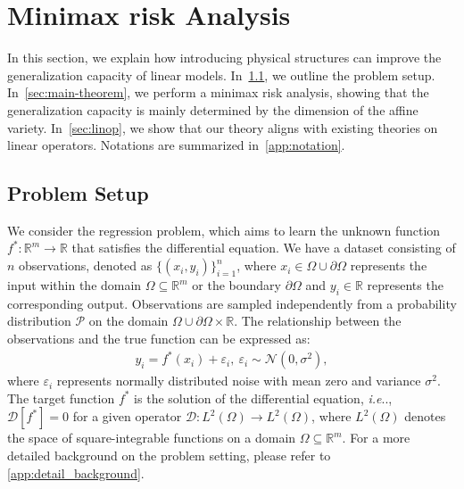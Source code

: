 \documentclass{article}
\makeatletter
\def\@onedot{\ifx\@let@token.\else.\null\fi\xspace}
\DeclareRobustCommand\onedot{\futurelet\@let@token\@onedot}
\def\ie{\emph{i.e}\onedot}
\theoremstyle{plain}
\theoremstyle{definition}
\theoremstyle{remark}
\makeatother
\begin{document}
\section{Minimax risk Analysis}
\label{sec:analysis}
In this section, we explain how introducing physical structures can improve the generalization capacity of linear models. In~\cref{sec:problem-setup}, we outline the problem setup. In~\cref{sec:main-theorem}, we perform a minimax risk analysis, showing that the generalization capacity is mainly determined by the dimension of the affine variety. In~\cref{sec:linop}, we show that our theory aligns with existing theories on linear operators. Notations are summarized in~\cref{app:notation}. 

\subsection{Problem Setup}
\label{sec:problem-setup}
We consider the regression problem, which aims to learn the unknown function \( f^* \colon \mathbb{R}^m \to \mathbb{R} \) that satisfies the differential equation. We have a dataset consisting of \( n \) observations, denoted as \( \{(x_i, y_i)\}_{i=1}^n \), where \( x_i \in \Omega \cup \partial \Omega \) represents the input within the domain \( \Omega \subseteq \mathbb{R}^m \) or the boundary $\partial \Omega$ and \( y_i \in \mathbb{R} \) represents the corresponding output. Observations are sampled independently from a probability distribution \(\mathcal{P}\) on the domain \(\Omega \cup \partial \Omega \times \mathbb{R}\). The relationship between the observations and the true function can be expressed as:
\begin{align*}
    y_i = f^*(x_i) + \varepsilon_i,\ \varepsilon_i \sim \mathcal{N}(0, \sigma^2),
\end{align*}
where \( \varepsilon_i \) represents normally distributed noise with mean zero and variance \( \sigma^2 \). 
The target function \(f^* \) is the solution of the differential equation, \ie, \( \mathscr{D}[f^*] = 0 \) for a given operator \( \mathscr{D} \colon L^2(\Omega) \to L^2(\Omega) \), where $L^2(\Omega)$ denotes the space of square-integrable functions on a domain $\Omega\subseteq \mathbb{R}^m$. For a more detailed background on the problem setting, please refer to \cref{app:detail_background}. 
\end{document}
